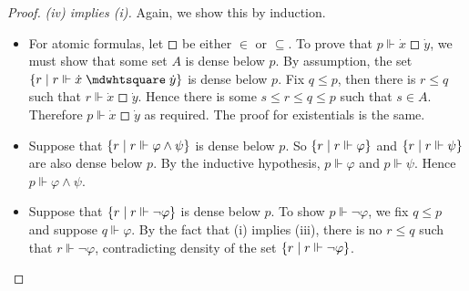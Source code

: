 \begin{proof}
    \emph{(iv) implies (i).}
    Again, we show this by induction.
    \begin{itemize}
        \item For atomic formulas, let \( \mdwhtsquare \) be either \( \in \) or \( \subseteq \).
        To prove that \( p \Vdash \dot x \mathrel{\mdwhtsquare} \dot y \), we must show that some set \( A \) is dense below \( p \).
        By assumption, the set \( \qty{r \mid r \Vdash \dot x \mathrel{\mdwhtsquare} \dot y} \) is dense below \( p \).
        Fix \( q \leq p \), then there is \( r \leq q \) such that \( r \Vdash \dot x \mathrel{\mdwhtsquare} \dot y \).
        Hence there is some \( s \leq r \leq q \leq p \) such that \( s \in A \).
        Therefore \( p \Vdash \dot x \mathrel{\mdwhtsquare} \dot y \) as required.
        The proof for existentials is the same.
        \item Suppose that \( \qty{r \mid r \Vdash \varphi \wedge \psi} \) is dense below \( p \).
        So \( \qty{r \mid r \Vdash \varphi} \) and \( \qty{r \mid r \Vdash \psi} \) are also dense below \( p \).
        By the inductive hypothesis, \( p \Vdash \varphi \) and \( p \Vdash \psi \).
        Hence \( p \Vdash \varphi \wedge \psi \).
        \item Suppose that \( \qty{r \mid r \Vdash \neg\varphi} \) is dense below \( p \).
        To show \( p \Vdash \neg\varphi \), we fix \( q \leq p \) and suppose \( q \Vdash \varphi \).
        By the fact that (i) implies (iii), there is no \( r \leq q \) such that \( r \Vdash \neg\varphi \), contradicting density of the set \( \qty{r \mid r \Vdash \neg\varphi} \).
    \end{itemize}
\end{proof}
